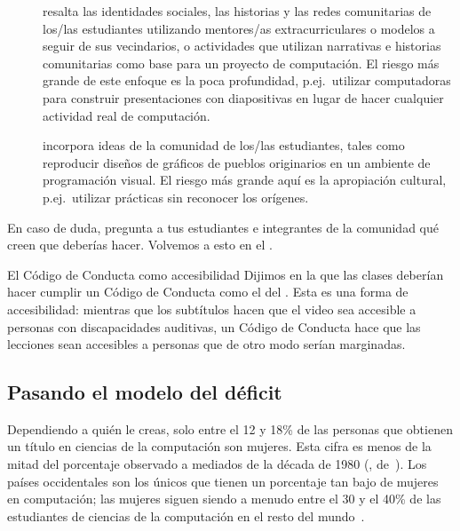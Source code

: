\begin{description}

\item[{}]
  resalta las identidades sociales, las historias y las redes comunitarias de los/las estudiantes
  utilizando mentores/as extracurriculares o modelos a seguir de sus vecindarios,
  o actividades que utilizan narrativas e historias comunitarias
  como base para un proyecto de computación.
  El riesgo más grande de este enfoque es la poca profundidad,
  p.ej.\ utilizar computadoras para construir presentaciones con diapositivas en lugar de hacer cualquier actividad real de computación.

\item[{}]
  incorpora ideas de la comunidad de los/las estudiantes,
  tales como reproducir diseños de gráficos de pueblos originarios en un ambiente de programación visual.
  El riesgo más grande aquí es la apropiación cultural,
  p.ej.\ utilizar prácticas sin reconocer los orígenes.

\end{description}

En caso de duda,
pregunta a tus estudiantes e integrantes de la comunidad qué creen que deberías hacer.
Volvemos a esto en el .

\begin{aside}{El Código de Conducta como accesibilidad}
  Dijimos en la  que las clases deberían hacer cumplir un Código de Conducta como el del .
  Esta es una forma de accesibilidad:
  mientras que los subtítulos hacen que el video sea accesible a personas con discapacidades auditivas,
  un Código de Conducta hace que las lecciones sean accesibles a personas que de otro modo serían marginadas.
\end{aside}

\subsection*{Pasando el modelo del déficit}

Dependiendo a quién le creas,
solo entre el 12 y 18\% de las personas que obtienen un título en ciencias de la computación son mujeres.
Esta cifra es menos de la mitad del porcentaje observado a mediados de la década de 1980
(, de~\cite{Robe2017}).
Los países occidentales son los únicos que tienen un porcentaje tan bajo de mujeres en computación;
las mujeres siguen siendo a menudo entre el 30 y el 40\% de las estudiantes de ciencias de la computación en el resto del mundo~\cite{Galp2002,Varm2015}.

